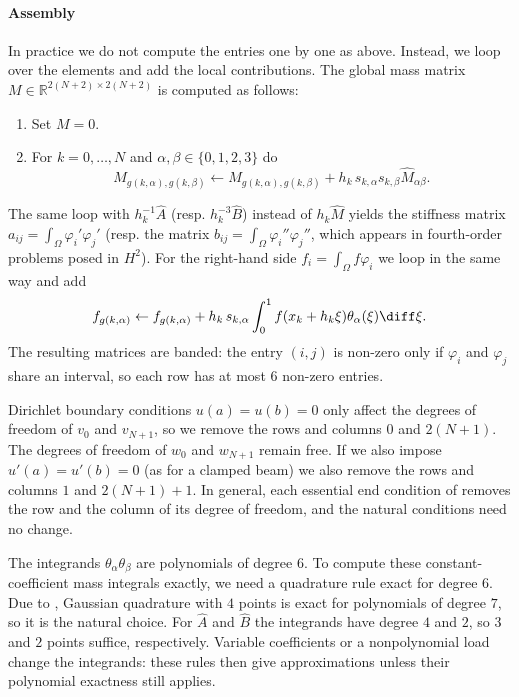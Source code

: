 \paragraph*{Assembly}
In practice we do not compute the entries one by one as above. Instead, we loop over the elements and add the local contributions.
The global mass matrix $M \in \mathbb R^{2(N+2) \times 2(N+2)}$ is computed as follows:
\begin{enumerate}
    \item Set $M = 0$.
    \item For $k = 0, \dots, N$ and $\alpha, \beta \in \{0, 1, 2, 3\}$ do
          \begin{equation*}
              M_{g(k,\alpha), g(k,\beta)} \gets M_{g(k,\alpha), g(k,\beta)} + h_k \, s_{k,\alpha} s_{k,\beta} \widehat M_{\alpha \beta}.
          \end{equation*}
\end{enumerate}
The same loop with $h_k^{-1} \widehat A$ (resp. $h_k^{-3} \widehat B$) instead of $h_k \widehat M$ yields the stiffness matrix $a_{ij} = \int_\Omega \varphi_i' \varphi_j'$ (resp. the matrix $b_{ij} = \int_\Omega \varphi_i'' \varphi_j''$, which appears in fourth-order problems posed in $H^2$).
For the right-hand side $f_i = \int_\Omega f \varphi_i$ we loop in the same way and add
\begin{equation*}
    f_{g(k,\alpha)} \gets f_{g(k,\alpha)} + h_k \, s_{k,\alpha} \int_0^1 f(x_k + h_k \xi) \theta_\alpha (\xi) \diff \xi.
\end{equation*}
The resulting matrices are banded: the entry $(i,j)$ is non-zero only if $\varphi_i$ and $\varphi_j$ share an interval, so each row has at most $6$ non-zero entries.

Dirichlet boundary conditions $u(a) = u(b) = 0$ only affect the degrees of freedom of $v_0$ and $v_{N+1}$, so we remove the rows and columns $0$ and $2(N+1)$. The degrees of freedom of $w_0$ and $w_{N+1}$ remain free.
If we also impose $u'(a) = u'(b) = 0$ (as for a clamped beam) we also remove the rows and columns $1$ and $2(N+1)+1$.
In general, each essential end condition of  removes the row and the column of its degree of freedom, and the natural conditions need no change.

\begin{remark}
    The integrands $\theta_\alpha \theta_\beta$ are polynomials of degree $6$.
    To compute these constant-coefficient mass integrals exactly, we need a quadrature rule exact for degree $6$.
    Due to , Gaussian quadrature with $4$ points is exact for polynomials of degree $7$, so it is the natural choice.
    For $\widehat A$ and $\widehat B$ the integrands have degree $4$ and $2$, so $3$ and $2$ points suffice, respectively. Variable coefficients or a nonpolynomial load change the integrands: these rules then give approximations unless their polynomial exactness still applies.
\end{remark}


